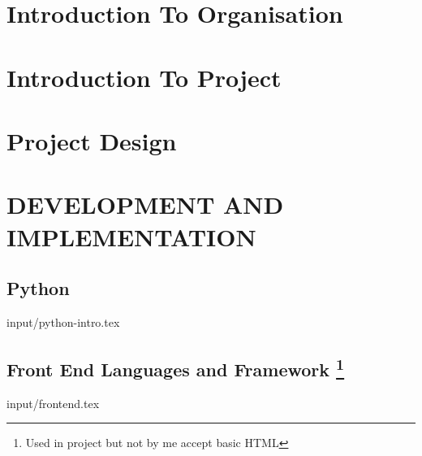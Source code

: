 \documentclass[12pt]{report}
\begin{document}

\begin{screen}
\ppttitle
\end{screen}
\footskip 0.7cm
\thispagestyle{empty} 
\pagetitle
\newpage
{}
\cfoot{\thepage}


\newpage



\newpage
\tableofcontents
\newpage
\listoffigures
\newpage
\listoftables   
\newpage

\cfoot{\thepage}

\newpage
\chapter{Introduction To Organisation}

\newpage
%
\chapter{Introduction To Project}


%
\chapter{Project Design}

%
%
%
\chapter{DEVELOPMENT AND IMPLEMENTATION}
\section{Python}
 {input/python-intro.tex} 

\section[Front End Languages and Framework]{Front End Languages         
and Framework \footnote{ Used in project but not by me accept           
basic HTML}} 
 {input/frontend.tex} 
\end{document}
